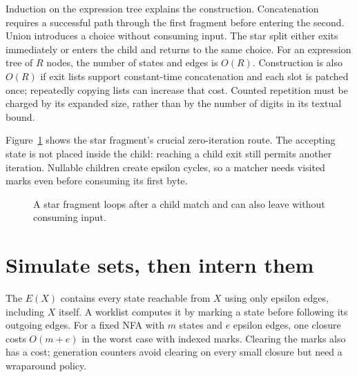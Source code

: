 Induction on the expression tree explains the construction.
Concatenation requires a successful path through the first fragment before entering the second.
Union introduces a choice without consuming input.
The star split either exits immediately or enters the child and returns to the same choice.
For an expression tree of $R$ nodes, the number of states and edges is $O(R)$.
Construction is also $O(R)$ if exit lists support constant-time concatenation and each slot is patched once; repeatedly copying lists can increase that cost.
Counted repetition must be charged by its expanded size, rather than by the number of digits in its textual bound.

Figure~\ref{fig:ch49-star} shows the star fragment's crucial zero-iteration route.
The accepting state is not placed inside the child: reaching a child exit still permits another iteration.
Nullable children create epsilon cycles, so a matcher needs visited marks even before consuming its first byte.

\begin{figure}[htbp]
\centering
{}
\caption{A star fragment loops after a child match and can also leave without consuming input.}
\label{fig:ch49-star}
\end{figure}

\section{Simulate sets, then intern them}
\label{sec:ch49-subsets}

The  $E(X)$ contains every state reachable from $X$ using only epsilon edges, including $X$ itself.
A worklist computes it by marking a state before following its outgoing edges.
For a fixed NFA with $m$ states and $e$ epsilon edges, one closure costs $O(m+e)$ in the worst case with indexed marks.
Clearing the marks also has a cost; generation counters avoid clearing on every small closure but need a wraparound policy.

